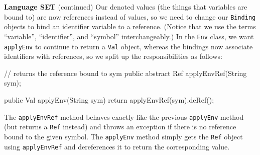 \begin{minipage}[t]{\sw}
\slidenumber
\LARGE
{\bf Language SET} (continued)\exx
Our denoted values (the things that variables are bound to)
are now references instead of values,
so we need to change our \verb'Binding' objects
to bind an identifier variable to a reference.
(Notice that we use the terms ``variable'', ``identifier'', and ``symbol''
interchangeably.)\exx
\emm{}\exx
In the \verb'Env' class,
we want \verb'applyEnv' to continue
to return a \verb'Val' object,
whereas the bindings now associate identifiers with references,
so we split up the responsibilities as follows:
\begin{qv}
// returns the reference bound to sym
public abstract Ref applyEnvRef(String sym);

public Val applyEnv(String sym) {
    return applyEnvRef(sym).deRef();
}
\end{qv}
The \verb'applyEnvRef' method behaves exactly like the previous
\verb'applyEnv' method (but returns a \verb'Ref' instead)
and throws an exception if there is no reference bound
to the given symbol.
The \verb'applyEnv' method simply gets the \verb'Ref' object
using \verb'applyEnvRef' and dereferences it
to return the corresponding value.
\end{minipage}

